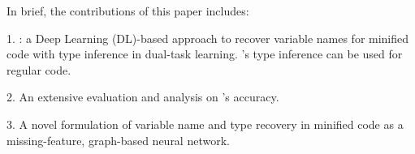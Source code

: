In brief, the contributions of this paper includes:

1. {\bf {\tool}}: a Deep Learning (DL)-based approach to recover
variable names for minified code with type inference in dual-task
learning. {\tool}'s type inference can be used for regular code.

2. An extensive evaluation and analysis on {\tool}'s
accuracy.



3. A novel formulation of variable name and type recovery in
minified code as a missing-feature, graph-based neural network.
